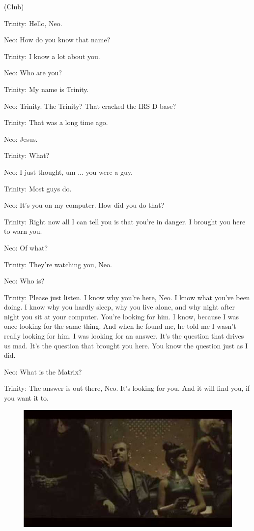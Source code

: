 \documentclass{ctexart}
\newenvironment{myquote}{\color{green} \setlength{\leftskip}{6em} \setlength{\rightskip}{4em} \setlength{\parindent}{-2em}}{\par}
\begin{document}
\begin{myquote}
(Club)

Trinity: Hello, Neo.

Neo: How do you know that name?

Trinity: I know a lot about you.

Neo: Who are you?

Trinity: My name is Trinity.

Neo: Trinity. The Trinity? That cracked the IRS D-base?

Trinity: That was a long time ago.

Neo: Jesus.

Trinity: What?

Neo: I just thought, um ... you were a guy.

Trinity: Most guys do.

Neo: It's you on my computer. How did you do that?

Trinity: Right now all I can tell you is that you're in danger. I brought you here to warn you.

Neo: Of what?

Trinity: They're watching you, Neo.

Neo: Who is?

Trinity: Please just listen. I know why you're here, Neo. I know what you've been doing. I know why you hardly sleep, why you live alone, and why night after night you sit at your computer. You're looking for him. I know, because I was once looking for the same thing. And when he found me, he told me I wasn't really looking for him. I was looking for an answer. It's the question that drives us mad. It's the question that brought you here. You know the question just as I did.

Neo: What is the Matrix?

Trinity: The answer is out there, Neo. It's looking for you. And it will find you, if you want it to.
\end{myquote}

\begin{figure}[htb]
\centering
\includegraphics[width=0.5\linewidth]{fig/read_Matrix-5}
\end{figure}
\end{document}
